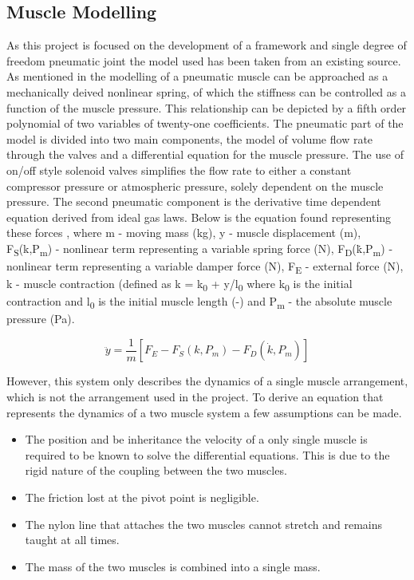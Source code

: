 \documentclass[11pt,a4paper]{article}
\begin{document}
\subsection{Muscle Modelling}
\label{sub:muscle_modelling}
As this project is focused on the development of a framework and single degree of freedom pneumatic joint the model used has been taken from an existing source. As mentioned in  the modelling of a pneumatic muscle can be approached as a mechanically deived nonlinear spring, of which the stiffness can be controlled as a function of the muscle pressure. This relationship can be depicted by a fifth order polynomial of two variables of twenty-one coefficients. The pneumatic part of the model is divided into two main components, the model of volume flow rate through the valves and a differential equation for the muscle pressure. The use of on/off style solenoid valves simplifies the flow rate to either a constant compressor pressure or atmospheric pressure, solely dependent on the muscle pressure. The second pneumatic component is the derivative time dependent equation derived from ideal gas laws. Below is the equation found representing these forces , where m - moving mass (kg), y - muscle displacement (m), F\textsubscript{S}(k,P\textsubscript{m}) - nonlinear term representing a variable spring force (N), F\textsubscript{D}(\.{k},P\textsubscript{m}) - nonlinear term representing a variable damper force (N), F\textsubscript{E} - external force (N), k - muscle contraction (defined as k = k\textsubscript{0} + y/l\textsubscript{0} where k\textsubscript{0} is the initial contraction and l\textsubscript{0} is the initial muscle length (-) and P\textsubscript{m} - the absolute muscle pressure (Pa).

\begin{equation}
    \ddot{y} = \frac{1}{m}[F_E-F_S(k,P_m)-F_D(\dot{k},P_m)]
    \label{math:dynamicforce2}
\end{equation}

However, this system only describes the dynamics of a single muscle arrangement, which is not the arrangement used in the project. To derive an equation that represents the dynamics of a two muscle system a few assumptions can be made. 
\begin{itemize}
  \item The position and be inheritance the velocity of a only single muscle is required to be known to solve the differential equations. This is due to the rigid nature of the coupling between the two muscles. 
  \item The friction lost at the pivot point is negligible.
  \item The nylon line that attaches the two muscles cannot stretch and remains taught at all times.
  \item The mass of the two muscles is combined into a single mass.
\end{itemize}
\end{document}
